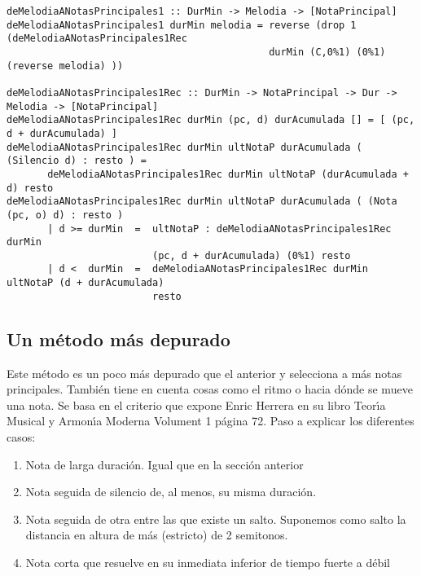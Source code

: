 \small
\begin{verbatim}
deMelodiaANotasPrincipales1 :: DurMin -> Melodia -> [NotaPrincipal]
deMelodiaANotasPrincipales1 durMin melodia = reverse (drop 1 (deMelodiaANotasPrincipales1Rec 
                                             durMin (C,0%1) (0%1) (reverse melodia) ))

deMelodiaANotasPrincipales1Rec :: DurMin -> NotaPrincipal -> Dur -> Melodia -> [NotaPrincipal]
deMelodiaANotasPrincipales1Rec durMin (pc, d) durAcumulada [] = [ (pc, d + durAcumulada) ]
deMelodiaANotasPrincipales1Rec durMin ultNotaP durAcumulada ( (Silencio d) : resto ) = 
       deMelodiaANotasPrincipales1Rec durMin ultNotaP (durAcumulada + d) resto
deMelodiaANotasPrincipales1Rec durMin ultNotaP durAcumulada ( (Nota (pc, o) d) : resto ) 
       | d >= durMin  =  ultNotaP : deMelodiaANotasPrincipales1Rec durMin 
                         (pc, d + durAcumulada) (0%1) resto
       | d <  durMin  =  deMelodiaANotasPrincipales1Rec durMin ultNotaP (d + durAcumulada) 
                         resto
\end{verbatim}
\normalsize

\subsection{Un m\'etodo m\'as depurado}
Este m\'etodo es un poco m\'as depurado que el anterior y selecciona a m\'as
notas principales. Tambi\'en tiene en cuenta cosas como el ritmo o 
hacia d\'onde se mueve una nota. Se basa en el criterio que expone
Enric Herrera en su libro Teor\'\i a Musical y Armon\'\i a Moderna 
Volument 1 p\'agina 72. Paso a explicar los diferentes casos:
\begin{enumerate}
\item Nota de larga duraci\'on. Igual que en la secci\'on anterior
\item Nota seguida de silencio de, al menos, su misma duraci\'on.
\item Nota seguida de otra entre las que existe un salto. Suponemos como
salto la distancia en altura de m\'as (estricto) de 2 semitonos.
\item Nota corta que resuelve en su inmediata inferior de tiempo fuerte a d\'ebil
\end{enumerate}

